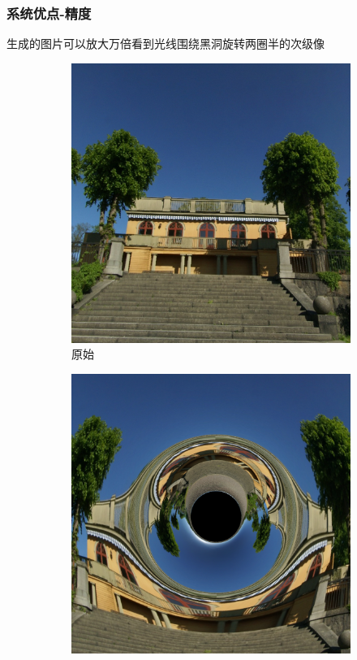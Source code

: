 \documentclass{beamer}
\begin{document}
\begin{frame}
\end{frame}

\begin{frame}
    \frametitle{系统优点-精度}
    生成的图片可以放大万倍看到光线围绕黑洞旋转两圈半的次级像
    \begin{figure}[H]
        \centering
        \begin{subfigure}{.24\textwidth}
            \centering
            \includegraphics[width=.8\linewidth]{images/building.png}
            \caption{原始}
            \label{fig:starless_test}
        \end{subfigure}%
        \begin{subfigure}{.24\textwidth}
            \centering
            \includegraphics[width=.8\linewidth]{images/building_distort.png}

\end{subfigure}
\end{figure}
\end{frame}
\end{document}
